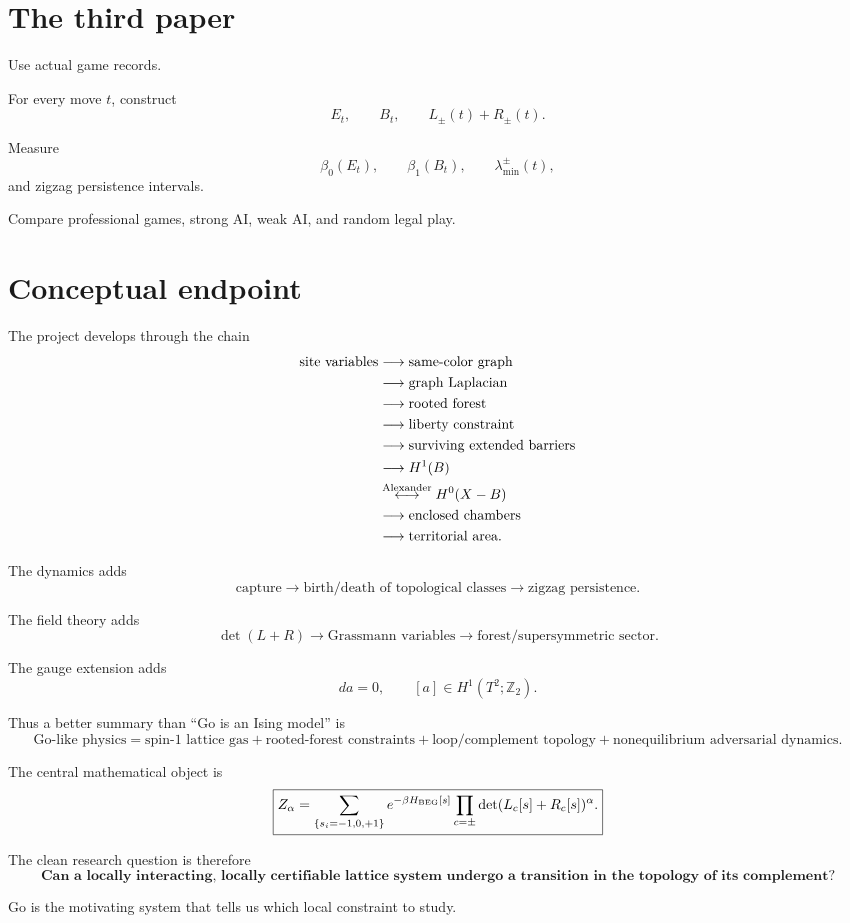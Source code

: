 \documentclass[11pt]{article}
\begin{document}
\section{The third paper}

Use actual game records.

For every move \(t\), construct
\[
E_t,\qquad
B_t,\qquad
L_\pm(t)+R_\pm(t).
\]

Measure
\[
\beta_0(E_t),
\qquad
\beta_1(B_t),
\qquad
\lambda_{\min}^{\pm}(t),
\]
and zigzag persistence intervals.

Compare professional games, strong AI, weak AI, and random legal play.

\section{Conceptual endpoint}

The project develops through the chain
\[
\begin{aligned}
\text{site variables}
&\longrightarrow
\text{same-color graph}\\
&\longrightarrow
\text{graph Laplacian}\\
&\longrightarrow
\text{rooted forest}\\
&\longrightarrow
\text{liberty constraint}\\
&\longrightarrow
\text{surviving extended barriers}\\
&\longrightarrow
H^1(B)\\
&\overset{\rm Alexander}{\longleftrightarrow}
H^0(X-B)\\
&\longrightarrow
\text{enclosed chambers}\\
&\longrightarrow
\text{territorial area}.
\end{aligned}
\]

The dynamics adds
\[
\text{capture}
\longrightarrow
\text{birth/death of topological classes}
\longrightarrow
\text{zigzag persistence}.
\]

The field theory adds
\[
\det(L+R)
\longrightarrow
\text{Grassmann variables}
\longrightarrow
\text{forest/supersymmetric sector}.
\]

The gauge extension adds
\[
da=0,
\qquad
[a]\in H^1(T^2;\mathbb Z_2).
\]

Thus a better summary than ``Go is an Ising model'' is
\[
\boxed{
\text{Go-like physics}
=
\text{spin-1 lattice gas}
+
\text{rooted-forest constraints}
+
\text{loop/complement topology}
+
\text{nonequilibrium adversarial dynamics}.
}
\]

The central mathematical object is
\[
\boxed{
Z_\alpha
=
\sum_{\{s_i=-1,0,+1\}}
e^{-\beta H_{\rm BEG}[s]}
\prod_{c=\pm}
\det(L_c[s]+R_c[s])^\alpha.
}
\]

The clean research question is therefore
\[
\boxed{
\textbf{
Can a locally interacting, locally certifiable lattice system undergo a transition in the topology of its complement?
}
}
\]

Go is the motivating system that tells us which local constraint to study.
\end{document}
